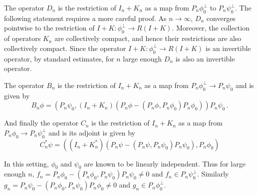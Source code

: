 The operator $D_{n}$ is the restriction of $I_{n} + K_{n}$ 
as a map from $P_{n} \phi_{0}^{\perp}$ 
to $P_{n} \psi_{0}^{\perp}$.
The following statement requires a more careful proof.
{\color{red} As $n \to \infty$, $D_{n}$ converges pointwise to the restriction
of $I + K: \phi_{0}^{\perp} \to R(I+K)$. Moreover, the collection
of operators $K_{n}$ are collectively compact, and hence their restrictions
are also collectively compact. 
Since the operator $I+K: \phi_{0}^{\perp} \to R(I+K)$ is an invertible
operator, by standard estimates, for $n$ large enough $D_{n}$ is also 
an invertible operator.}

The operator $B_{n}$ is the restriction of $I_{n} + K_{n}$ as a map from 
$P_{n} \phi_{0} ^{\perp} \to P_{n} \psi_{0}$ and is given by
\begin{equation}
B_{n} \phi = \left( P_{n} \psi_{0}, (I_{n} + K_{n}) 
(P_{n} \phi -( P_{n} \phi, P_{n} \phi_{0}) P_{n} \phi_{0}) \right) P_{n} \psi_{0}  \, .
\end{equation}

And finally the operator $C_{n}$ is the restriction of $I_{n} + K_{n}$ as a map from
$P_{n} \phi_{0} \to P_{n} \psi_{0}^{\perp}$ and is its adjoint is given by
\begin{equation}
C_{n}^{\ast}\psi = \left( (I_{n} + K_{n}^{\ast}) \left(P_{n} \psi - (P_{n} \psi, P_{n} \psi_{0}) P_{n} \psi_{0} \right), P_{n} \phi_{0} \right)
\end{equation}

In this setting, $\phi_{0}$ and $\psi_{0}$ are known to be linearly independent.
Thus for large enough $n$, 
$f_{n} = P_{n} \phi_{0} - (P_{n} \phi_{0}, P_{n} \psi_{0}) P_{n} \psi_{0} \neq 0$
and $f_{n} \in P_{n} \psi_{0}^{\perp}$.
Similarly $g_{n} = P_{n} \psi_{0} - (P_{n}\phi_{0}, P_{n} \psi_{0}) P_{n} \phi_{0} \neq 0$
and $g_{n} \in P_{n} \phi_{0}^{\perp}$.

